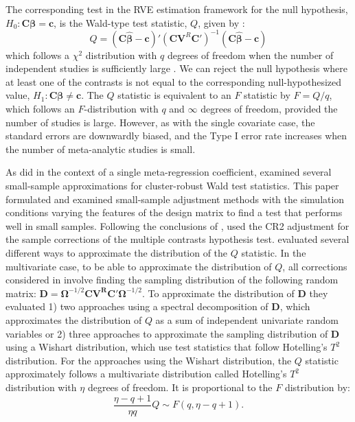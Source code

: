 The corresponding test in the RVE estimation framework for the null hypothesis, $H_0: \mathbf{C}\bm{\beta} = \mathbf{c}$, is the Wald-type test statistic, $Q$, given by \autocite{tipton2015b}:
\begin{equation} \label{eq: omnibus test all predictors}
    Q = (\mathbf{C}\bm{\hat{\beta}} - \mathbf{c})'(\mathbf{C}\mathbf{V}^R\mathbf{C}')^{-1}(\mathbf{C}\bm{\hat{\beta}} - \mathbf{c})
\end{equation}
which follows a $\chi^2$ distribution with $q$ degrees of freedom when the number of independent studies is sufficiently large \autocite{tipton2015b}. We can reject the null hypothesis where at least one of the contrasts is not equal to the corresponding null-hypothesized value, $H_1: \mathbf{C}\bm{\beta} \neq \mathbf{c}$. The $Q$ statistic is equivalent to an $F$ statistic by $F = Q/q$, which follows an $F$-distribution with $q$ and $\infty$ degrees of freedom, provided the number of studies is large. However, as with the single covariate case, the standard errors are downwardly biased, and the Type I error rate increases when the number of meta-analytic studies is small. 

As \textcite{tipton2015a} did in the context of a single meta-regression coefficient, \textcite{tipton2015b} examined several small-sample approximations for cluster-robust Wald test statistics. This paper formulated and examined small-sample adjustment methods with the simulation conditions varying the features of the design matrix to find a test that performs well in small samples. Following the conclusions of \textcite{tipton2015a}, \textcite{tipton2015b} used the CR2 adjustment for the sample corrections of the multiple contrasts hypothesis test. \textcite{tipton2015b} evaluated several different ways to approximate the distribution of the $Q$ statistic. 
In the multivariate case, to be able to approximate the distribution of $Q$, all corrections considered in \textcite{tipton2015b} involve finding the sampling distribution of the following random matrix: $\mathbf{D} = \mathbf{\Omega}^{-1/2}\mathbf{C}\mathbf{V^R}\mathbf{C}'\mathbf{\Omega}^{-1/2}$. 
To approximate the distribution of $\mathbf{D}$ they evaluated 1) two approaches using a spectral decomposition of $\mathbf{D}$, which approximates the distribution of $Q$ as a sum of independent univariate random variables or 2) three approaches to approximate the sampling distribution of $\mathbf{D}$ using a Wishart distribution, which use test statistics that follow Hotelling's $T^2$ distribution. For the approaches using the Wishart distribution, the $Q$ statistic approximately follows a multivariate distribution called Hotelling's $T^2$ distribution with $\eta$ degrees of freedom. It is proportional to the $F$ distribution by:
\begin{equation}
    \frac{\eta - q +1}{\eta q}Q \sim F(q, \eta -q +1).
\end{equation}


